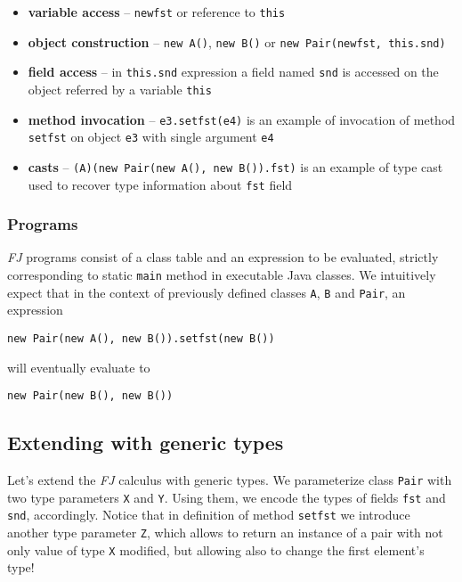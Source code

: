 \documentclass{article}[12pt]
\begin{document}
\begin{itemize}
\item{\textbf{variable access}} -- \texttt{newfst} or reference to
  \texttt{this}
\item{\textbf{object construction}} -- \texttt{new A()},
  \texttt{new B()} or \texttt{new Pair(newfst, this.snd)}
\item{\textbf{field access}} -- in \texttt{this.snd} expression 
  a field named \texttt{snd} is accessed on the object referred by
  a variable \texttt{this}
\item{\textbf{method invocation}} -- \texttt{e3.setfst(e4)}
  is an example of invocation of method \texttt{setfst} on object
  \texttt{e3} with single argument \texttt{e4}
\item{\textbf{casts}} -- \texttt{(A)(new Pair(new A(), new B()).fst)}
  is an example of type cast used to recover type information about
  \texttt{fst} field
\end{itemize}

\subsubsection{Programs}

\emph{FJ} programs consist of a class table and an expression
to be evaluated, strictly corresponding to static \texttt{main} method in
executable Java classes. We intuitively expect that in the context
of previously defined classes \texttt{A}, \texttt{B} and \texttt{Pair},
an expression

\begin{verbatim}
new Pair(new A(), new B()).setfst(new B())
\end{verbatim}
will eventually evaluate to
\begin{verbatim}
new Pair(new B(), new B())
\end{verbatim}


\subsection{Extending with generic types}

Let's extend the \emph{FJ} calculus with generic types. We parameterize
class \texttt{Pair} with two type parameters \texttt{X} and \texttt{Y}.
Using them, we encode the types of fields \texttt{fst} and \texttt{snd},
accordingly. Notice that in definition of method \texttt{setfst} we
introduce another type parameter \texttt{Z}, which allows to return
an instance of a pair with not only value of type \texttt{X} modified,
but allowing also to change the first element's type!
\end{document}
